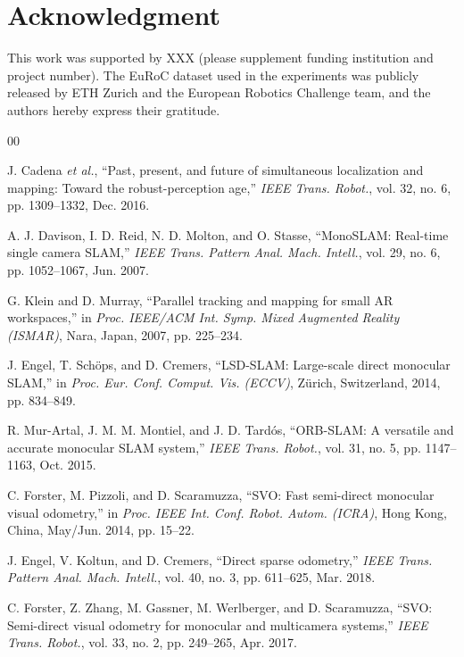 \documentclass[journal,twoside,web]{ieeecolor}
\begin{document}
\section*{Acknowledgment}

This work was supported by XXX (please supplement funding institution and project number). The EuRoC dataset used in the experiments was publicly released by ETH Zurich and the European Robotics Challenge team, and the authors hereby express their gratitude.

\begin{thebibliography}{00}

 J. Cadena \emph{et al.}, ``Past, present, and future of simultaneous localization and mapping: Toward the robust-perception age,'' \emph{IEEE Trans. Robot.}, vol. 32, no. 6, pp. 1309--1332, Dec. 2016.

 A. J. Davison, I. D. Reid, N. D. Molton, and O. Stasse, ``MonoSLAM: Real-time single camera SLAM,'' \emph{IEEE Trans. Pattern Anal. Mach. Intell.}, vol. 29, no. 6, pp. 1052--1067, Jun. 2007.

 G. Klein and D. Murray, ``Parallel tracking and mapping for small AR workspaces,'' in \emph{Proc. IEEE/ACM Int. Symp. Mixed Augmented Reality (ISMAR)}, Nara, Japan, 2007, pp. 225--234.

 J. Engel, T. Sch\"ops, and D. Cremers, ``LSD-SLAM: Large-scale direct monocular SLAM,'' in \emph{Proc. Eur. Conf. Comput. Vis. (ECCV)}, Z\"urich, Switzerland, 2014, pp. 834--849.

 R. Mur-Artal, J. M. M. Montiel, and J. D. Tard\'os, ``ORB-SLAM: A versatile and accurate monocular SLAM system,'' \emph{IEEE Trans. Robot.}, vol. 31, no. 5, pp. 1147--1163, Oct. 2015.

 C. Forster, M. Pizzoli, and D. Scaramuzza, ``SVO: Fast semi-direct monocular visual odometry,'' in \emph{Proc. IEEE Int. Conf. Robot. Autom. (ICRA)}, Hong Kong, China, May/Jun. 2014, pp. 15--22.

 J. Engel, V. Koltun, and D. Cremers, ``Direct sparse odometry,'' \emph{IEEE Trans. Pattern Anal. Mach. Intell.}, vol. 40, no. 3, pp. 611--625, Mar. 2018.

 C. Forster, Z. Zhang, M. Gassner, M. Werlberger, and D. Scaramuzza, ``SVO: Semi-direct visual odometry for monocular and multicamera systems,'' \emph{IEEE Trans. Robot.}, vol. 33, no. 2, pp. 249--265, Apr. 2017.


\end{thebibliography}
\end{document}
